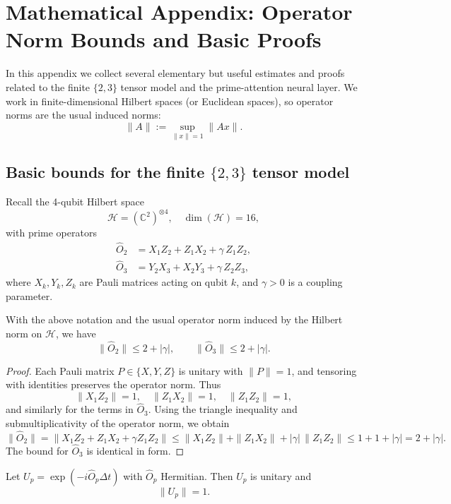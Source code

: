\documentclass[11pt]{article}
\begin{document}
\appendix
\section{Mathematical Appendix: Operator Norm Bounds and Basic Proofs}

In this appendix we collect several elementary but useful estimates and proofs related to the finite $\{2,3\}$ tensor model and the prime-attention neural layer. We work in finite-dimensional Hilbert spaces (or Euclidean spaces), so operator norms are the usual induced norms:
\[
\|A\| := \sup_{\|x\|=1} \|Ax\|.
\]

\subsection{Basic bounds for the finite $\{2,3\}$ tensor model}

Recall the 4-qubit Hilbert space
\[
\mathcal{H} = (\mathbb{C}^2)^{\otimes 4},\quad \dim(\mathcal{H}) = 16,
\]
with prime operators
\begin{align*}
\hat{O}_2 &= X_1 Z_2 + Z_1 X_2 + \gamma\, Z_1 Z_2,\\
\hat{O}_3 &= Y_2 X_3 + X_2 Y_3 + \gamma\, Z_2 Z_3,
\end{align*}
where $X_k,Y_k,Z_k$ are Pauli matrices acting on qubit $k$, and $\gamma>0$ is a coupling parameter.

\begin{lemma}
\label{lem:OpNormPrime}
With the above notation and the usual operator norm induced by the Hilbert norm on $\mathcal{H}$, we have
\[
\|\hat{O}_2\| \le 2 + |\gamma|,\qquad
\|\hat{O}_3\| \le 2 + |\gamma|.
\]
\end{lemma}

\begin{proof}
Each Pauli matrix $P\in\{X,Y,Z\}$ is unitary with $\|P\|=1$, and tensoring with identities preserves the operator norm. Thus
\[
\|X_1 Z_2\| = 1,\quad \|Z_1 X_2\|=1,\quad \|Z_1 Z_2\|=1,
\]
and similarly for the terms in $\hat{O}_3$. Using the triangle inequality and submultiplicativity of the operator norm, we obtain
\[
\|\hat{O}_2\|
= \|X_1 Z_2 + Z_1 X_2 + \gamma Z_1 Z_2\|
\le \|X_1 Z_2\| + \|Z_1 X_2\| + |\gamma| \,\|Z_1 Z_2\|
\le 1 + 1 + |\gamma| = 2 + |\gamma|.
\]
The bound for $\hat{O}_3$ is identical in form.
\end{proof}

\begin{lemma}
\label{lem:UnitaryBound}
Let $U_p = \exp(-i \hat{O}_p \Delta t)$ with $\hat{O}_p$ Hermitian. Then $U_p$ is unitary and
\[
\|U_p\| = 1.
\]
\end{lemma}
\end{document}
